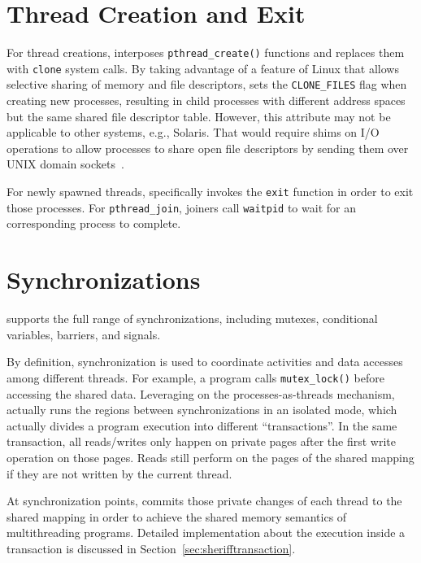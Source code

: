 \section{Thread Creation and Exit}
\label{sec:threadcreat}

For thread creations, \sheriff{} interposes \texttt{pthread\_create()} functions and replaces them with \texttt{clone} system calls. 
By taking advantage of a feature of Linux that allows
selective sharing of memory and file descriptors, \sheriff{}
sets the \texttt{CLONE\_FILES} flag when creating new processes, resulting in child processes with different address spaces but the same shared file descriptor table. However, this attribute may not be applicable to other systems, e.g., Solaris. That would require shims on I/O operations to allow processes to share open file descriptors by sending
them over UNIX domain sockets~\cite[Section 17.4]{unixprogramming}.

For newly spawned threads, \sheriff{} specifically invokes the \texttt{exit} function in order to exit those processes. For \texttt{pthread\_join}, joiners call \texttt{waitpid} to wait for an corresponding process to complete.  

\section{Synchronizations}
\label{sec:sheriffsync}

\sheriff{} supports the full range of synchronizations, including mutexes, conditional variables, barriers, and signals. 

By definition, synchronization is used to coordinate activities and data accesses among different threads. For example, a program calls \texttt{mutex\_lock()} before accessing the shared data. Leveraging on the processes-as-threads mechanism, \sheriff{} actually runs the regions between synchronizations in an isolated mode, which actually divides a program execution into different ``transactions''. In the same transaction, all reads/writes only happen on private pages after the first write operation on those pages. Reads still perform on the pages of the shared mapping if they are not written by the current thread.

At synchronization points, \sheriff{} commits those private changes of each thread to the shared mapping in order to achieve the shared memory semantics of multithreading programs. Detailed implementation about the execution inside a transaction is discussed in Section~\ref{sec:sherifftransaction}. 

